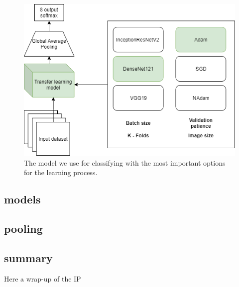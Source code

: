 \begin{figure}[h]
        \centering
        \includegraphics[scale=0.5]{experiments/figures/model.png}
        \caption{ The model we use for classifying with the most important options for the learning process. }
    \label{fig:KTLmodel}
\end{figure}


\subsection{models}

\subsection{pooling}


\subsection{summary}
Here a wrap-up of the IP











